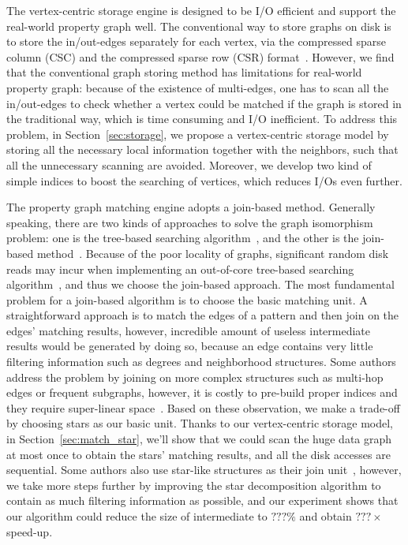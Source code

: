 The vertex-centric storage engine is designed to be I/O efficient and support the real-world property graph well.
The conventional way to store graphs on disk is to store the in/out-edges separately for each vertex,
via the compressed sparse column (CSC) and the compressed sparse row (CSR) format~\cite{DBLP:conf/sc/PearceGA10}.
However, we find that the conventional graph storing method has limitations for real-world property graph:
because of the existence of multi-edges,
one has to scan all the in/out-edges to check whether a vertex could be matched if the graph is stored in the traditional way, which is time consuming and I/O inefficient.
To address this problem, in Section~\ref{sec:storage},
we propose a vertex-centric storage model by storing all the necessary local information together with the neighbors,
such that all the unnecessary scanning are avoided.
Moreover, we develop two kind of simple indices to boost the searching of vertices, which reduces I/Os even further.

The property graph matching engine adopts a join-based method.
Generally speaking, there are two kinds of approaches to solve the graph isomorphism problem:
one is the tree-based searching algorithm~\cite{DBLP:journals/jacm/Ullmann76,DBLP:conf/sigmod/HanLL13}, and the other is the join-based method~\cite{DBLP:journals/pvldb/LaiQLC15,DBLP:journals/pvldb/QiaoZC17,DBLP:journals/pvldb/MhedhbiS19}.
Because of the poor locality of graphs, significant random disk reads may incur when implementing an out-of-core tree-based searching algorithm~\cite{DBLP:conf/sigmod/KimLBHLKJ16}, and thus we choose the join-based approach.
The most fundamental problem for a join-based algorithm is to choose the basic matching unit.
A straightforward approach is to match the edges of a pattern and then join on the edges' matching results,
however, incredible amount of useless intermediate results would be generated by doing so,
because an edge contains very little filtering information such as degrees and neighborhood structures.
Some authors address the problem by joining on more complex structures such as multi-hop edges or frequent subgraphs,
however, it is costly to pre-build proper indices and they require super-linear space~\cite{DBLP:journals/pvldb/SunWWSL12}.
Based on these observation, we make a trade-off by choosing stars as our basic unit.
Thanks to our vertex-centric storage model, in Section~\ref{sec:match_star}, we'll show that we could scan the huge data graph at most once to obtain the stars' matching results, and all the disk accesses are sequential.
Some authors also use star-like structures as their join unit~\cite{DBLP:journals/pvldb/SunWWSL12,DBLP:journals/pvldb/LaiQLC15}, however, we take more steps further by improving the star decomposition algorithm to contain as much filtering information as possible, and our experiment shows that our algorithm could reduce the size of intermediate to $???\%$ and obtain $???\times$ speed-up.

